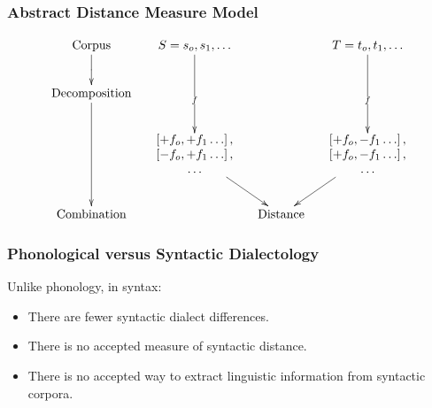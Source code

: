 \documentclass{beamer}
\begin{document}
\begin{frame}
\frametitle{Abstract Distance Measure Model}
\[\xymatrix@C=1pc{
 \textrm{Corpus} \ar@{>}[d]|{} &
  S = s_o,s_1,\ldots
  \ar@{>}[dd]|{f}
  &&
  T = t_o,t_1,\ldots
  \ar@{>}[dd]|{f}
  \\
\textrm{Decomposition}\ar@{>}[dd] &&&\\
 &
 *{\begin{array}{c}
     \left[ + f_o, +f_1 \ldots \right], \\
     \left[ - f_o, +f_1 \ldots \right], \\
     \ldots \\ \end{array}}
 \ar@{>}[dr]
 &&
 *{\begin{array}{c}
     \left[ + f_o, -f_1 \ldots \right], \\
     \left[ + f_o, -f_1 \ldots \right], \\
     \ldots \\ \end{array}}
 \ar@{>}[dl]  \\
 \textrm{Combination} && \textrm{Distance} & \\
} \]
\end{frame}


\begin{frame}
  \frametitle{Phonological versus Syntactic Dialectology}
  Unlike phonology, in syntax:
  \begin{itemize}
  \item There are fewer syntactic dialect differences.
  \item There is no accepted measure of syntactic distance.
  \item There is no accepted way to extract linguistic information
    from syntactic corpora.
  \end{itemize}
\end{frame}
\end{document}
